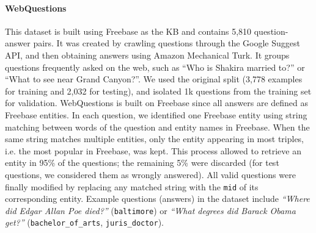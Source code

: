 \documentclass[runningheads,a4paper]{llncs}
\newcommand{\fb}{{\sc Freebase}\xspace}
\newcommand{\wq}{{\sc WebQuestions}\xspace}
\newcommand{\ent}[1]{{\small {\tt #1}}}
\begin{document}
\paragraph{WebQuestions}
This dataset is built using \fb as the KB and contains 5,810
question-answer pairs.  It was created by crawling questions through
the Google Suggest API, and then obtaining answers using Amazon
Mechanical Turk.   It groups questions frequently asked on the
web, such as ``Who is Shakira married to?'' or ``What to see near
Grand Canyon?''.  \fi We used the original split (3,778 examples for
training and 2,032 for testing), and isolated 1k questions from the
training set for validation.
\wq is built on \fb since all answers are defined as \fb entities.
In each question, we identified one \fb entity using string matching between words
of the question and entity names in \fb.
When the same string matches multiple entities, only the entity
appearing in most triples, i.e. the most popular in \fb, was kept.
This process allowed to retrieve an entity in 95\% of the
questions; the remaining 5\% were discarded (for test questions, we
considered them as wrongly answered).  All valid questions were
finally modified by replacing any matched string with the \ent{mid} of
its corresponding entity.  
\fi 
Example questions (answers) in the dataset include 
{\em ``Where did Edgar  Allan Poe died?''} (\ent{baltimore}) or  {\em ``What degrees did
  Barack Obama get?''} (\ent{bachelor\_of\_arts}, \ent{juris\_doctor}).
\end{document}
